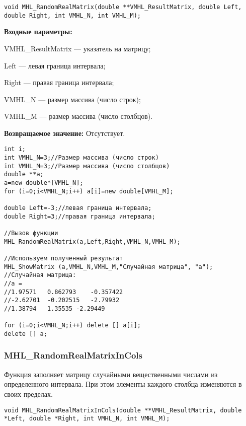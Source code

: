 \documentclass[a4paper,12pt]{article}
\begin{document}
\begin{lstlisting}[label=code_syntax_MHL_RandomRealMatrix,caption=Синтаксис]
void MHL_RandomRealMatrix(double **VMHL_ResultMatrix, double Left, double Right, int VMHL_N, int VMHL_M);
\end{lstlisting}

\textbf{Входные параметры:}

 VMHL\_ResultMatrix --- указатель на матрицу;
 
 Left --- левая граница интервала;
 
 Right --- правая граница интервала;
 
 VMHL\_N --- размер массива (число строк);
 
 VMHL\_M --- размер массива (число столбцов).

\textbf{Возвращаемое значение:}
Отсутствует.


\begin{lstlisting}[label=code_use_MHL_RandomRealMatrix,caption=Пример использования]
int i;
int VMHL_N=3;//Размер массива (число строк)
int VMHL_M=3;//Размер массива (число столбцов)
double **a;
a=new double*[VMHL_N];
for (i=0;i<VMHL_N;i++) a[i]=new double[VMHL_M];

double Left=-3;//левая граница интервала;
double Right=3;//правая граница интервала;

//Вызов функции
MHL_RandomRealMatrix(a,Left,Right,VMHL_N,VMHL_M);

//Используем полученный результат
MHL_ShowMatrix (a,VMHL_N,VMHL_M,"Случайная матрица", "a");
//Случайная матрица:
//a =
//1.97571	0.862793	-0.357422
//-2.62701	-0.202515	-2.79932
//1.38794	1.35535	-2.29449

for (i=0;i<VMHL_N;i++) delete [] a[i];
delete [] a;
\end{lstlisting}

\subsubsection{MHL\_RandomRealMatrixInCols}\label{MHL_RandomRealMatrixInCols}

Функция заполняет матрицу случайными вещественными числами из определенного интервала. При этом элементы каждого столбца изменяются в своих пределах.


\begin{lstlisting}[label=code_syntax_MHL_RandomRealMatrixInCols,caption=Синтаксис]
void MHL_RandomRealMatrixInCols(double **VMHL_ResultMatrix, double *Left, double *Right, int VMHL_N, int VMHL_M);
\end{lstlisting}
\end{document}
